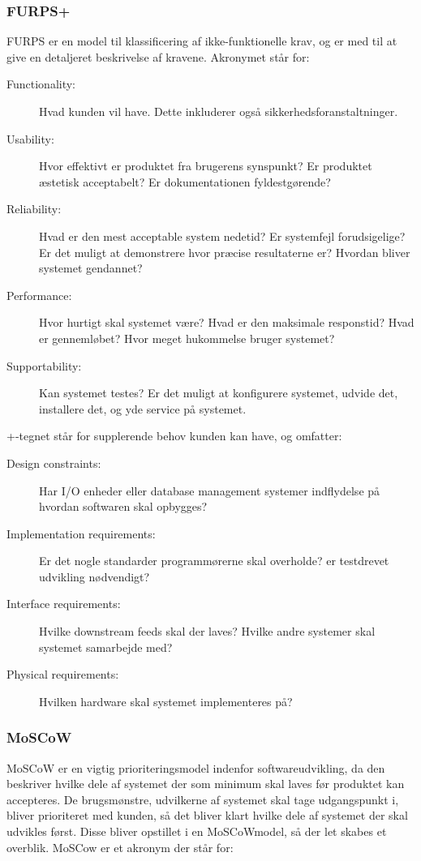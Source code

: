 \subsubsection{FURPS+}
FURPS er en model til klassificering af ikke-funktionelle krav, og er med til at give en detaljeret beskrivelse af kravene. Akronymet står for:

\begin{description}
    \item [Functionality:] Hvad kunden vil have. Dette inkluderer også sikkerhedsforanstaltninger.
    \item [Usability:] Hvor effektivt er produktet fra brugerens synspunkt? Er produktet æstetisk acceptabelt? Er dokumentationen fyldestgørende? 
    \item [Reliability:] Hvad er den mest acceptable system nedetid? Er systemfejl forudsigelige? Er det muligt at demonstrere hvor præcise resultaterne er? Hvordan bliver systemet gendannet?
    \item [Performance:] Hvor hurtigt skal systemet være? Hvad er den maksimale responstid? Hvad er gennemløbet? Hvor meget hukommelse bruger systemet?
    \item [Supportability:] Kan systemet testes? Er det muligt at konfigurere systemet, udvide det, installere det, og yde service på systemet.\\
\end{description}

\noindent
+-tegnet står for supplerende behov kunden kan have, og omfatter:

\begin{description}
    \item [Design constraints:] Har I/O enheder eller database management systemer indflydelse på hvordan softwaren skal opbygges?
    \item [Implementation requirements:] Er det nogle standarder programmørerne skal overholde? er testdrevet udvikling nødvendigt? 
    \item [Interface requirements:] Hvilke downstream feeds skal der laves? Hvilke andre systemer skal systemet samarbejde med?
    \item [Physical requirements:] Hvilken hardware skal systemet implementeres på?
\end{description}


\subsubsection{MoSCoW}
MoSCoW er en vigtig prioriteringsmodel indenfor softwareudvikling, da den beskriver hvilke dele af systemet der som minimum skal laves før produktet kan accepteres. De brugsmønstre, udvilkerne af systemet skal tage udgangspunkt i, bliver prioriteret med kunden, så det bliver klart hvilke dele af systemet der skal udvikles først. Disse bliver opstillet i en MoSCoWmodel, så der let skabes et overblik. MoSCow er et akronym der står for:

